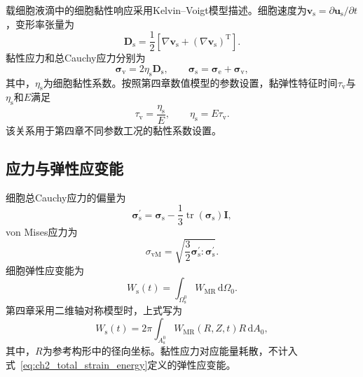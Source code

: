 载细胞液滴中的细胞黏性响应采用Kelvin--Voigt模型描述。细胞速度为$\boldsymbol{v}_{\mathrm s}=\partial\boldsymbol{u}_{\mathrm s}/\partial t$，变形率张量为
\begin{equation}
\boldsymbol{D}_{\mathrm s}
=
\frac{1}{2}\left[
\nabla\boldsymbol{v}_{\mathrm s}
+
\left(\nabla\boldsymbol{v}_{\mathrm s}\right)^{\mathrm T}
\right].
\label{eq:ch2_solid_rate}
\end{equation}
黏性应力和总Cauchy应力分别为
\begin{equation}
\boldsymbol{\sigma}_{\mathrm v}
=
2\eta_{\mathrm s}\boldsymbol{D}_{\mathrm s},
\qquad
\boldsymbol{\sigma}_{\mathrm s}
=
\boldsymbol{\sigma}_{\mathrm e}
+
\boldsymbol{\sigma}_{\mathrm v},
\label{eq:ch2_kelvin_voigt_3d}
\end{equation}
其中，$\eta_{\mathrm s}$为细胞黏性系数。按照第四章数值模型的参数设置，黏弹性特征时间$\tau_{\mathrm v}$与$\eta_{\mathrm s}$和$E$满足
\begin{equation}
\tau_{\mathrm v}
=
\frac{\eta_{\mathrm s}}{E},
\qquad
\eta_{\mathrm s}=E\tau_{\mathrm v}.
\label{eq:ch2_kelvin_voigt_time}
\end{equation}
该关系用于第四章不同参数工况的黏性系数设置\cite{christensen1982theory,lakes1998viscoelastic}。

\subsection{应力与弹性应变能}

细胞总Cauchy应力的偏量为
\begin{equation}
\boldsymbol{\sigma}_{\mathrm s}^{\prime}
=
\boldsymbol{\sigma}_{\mathrm s}
-
\frac{1}{3}
\operatorname{tr}\left(\boldsymbol{\sigma}_{\mathrm s}\right)
\boldsymbol{I},
\label{eq:ch2_deviatoric_stress}
\end{equation}
von Mises应力为
\begin{equation}
\sigma_{\mathrm{vM}}
=
\sqrt{
\frac{3}{2}
\boldsymbol{\sigma}_{\mathrm s}^{\prime}:\boldsymbol{\sigma}_{\mathrm s}^{\prime}}
.
\label{eq:ch2_von_mises}
\end{equation}
细胞弹性应变能为
\begin{equation}
W_{\mathrm s}(t)
=
\int_{\Omega_{\mathrm s}^0}
W_{\mathrm{MR}}\,\mathrm d\Omega_0.
\label{eq:ch2_total_strain_energy}
\end{equation}
第四章采用二维轴对称模型时，上式写为
\begin{equation}
W_{\mathrm s}(t)
=
2\pi\int_{A_{\mathrm s}^0}
W_{\mathrm{MR}}(R,Z,t)R\,\mathrm dA_0,
\label{eq:ch2_axisymmetric_strain_energy}
\end{equation}
其中，$R$为参考构形中的径向坐标。黏性应力对应能量耗散，不计入式~\eqref{eq:ch2_total_strain_energy}定义的弹性应变能。

